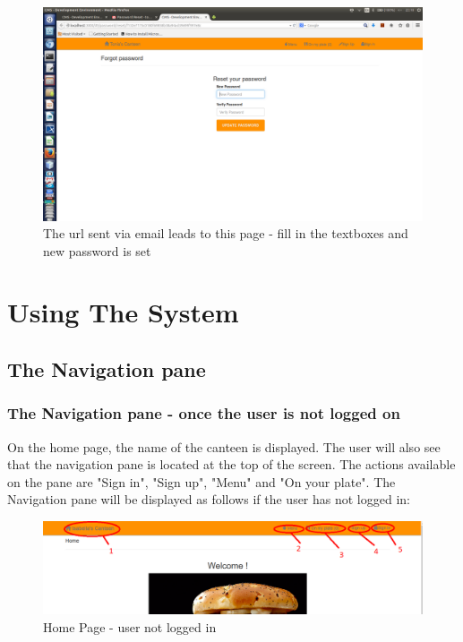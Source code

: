 \documentclass[a4paper,12pt]{report}
\begin{document}
\begin{figure}[H]
  \centering
    \includegraphics[width=1.0\textwidth]{screenshots/newPassForPass.png}
    \caption{The url sent via email leads to this page - fill in the textboxes and new password is set} 
\end{figure}


\section{Using The System} 

\subsection{The Navigation pane} 

\subsubsection{The Navigation pane - once the user is not  logged on}
On the home page, the name of the canteen is displayed. The user will also see that the navigation pane is located at the top of the screen. The actions available on the pane are "Sign in", "Sign up", "Menu" and "On your plate". 
The Navigation pane will be displayed as follows if the user has not logged in:

\begin{figure}[H]
  \centering
    \includegraphics[width=1.0\textwidth]{screenshots/HomePage.PNG}
    \caption{Home Page - user not logged in } 
\end{figure}
\end{document}
